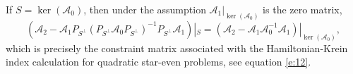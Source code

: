 \documentclass[review,onefignum,onetabnum]{siamart171218}
\def\ker{\mathop\mathrm{ker}\nolimits}
\newcommand{\rmd}{\mathrm{d}}
\newcommand{\calA}{\mathcal{A}}
\newcommand{\calL}{\mathcal{L}}
\begin{document}
\begin{remark}
If $S=\ker(\calA_0)$, then under the assumption $\calA_1|_{\ker(\calA_0)}$ is the zero matrix,
\[
\left(\calA_2-
\calA_1P_{S^\perp}\left(P_{S^\perp}\calA_0P_{S^\perp}\right)^{-1}P_{S^\perp}\calA_1\right)|_S=
\left(\calA_2-
\calA_1\calA_0^{-1}\calA_1\right)|_{\ker(\calA_0)},
\]
which is precisely the constraint matrix associated with the Hamiltonian-Krein index calculation for quadratic star-even problems, see equation \cref{e:12}.
\end{remark}

%
%
\end{document}
